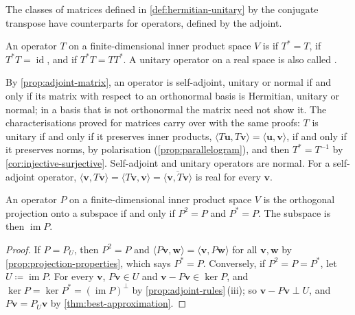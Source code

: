The classes of matrices defined in \cref{def:hermitian-unitary} by the conjugate transpose have counterparts for operators, defined by the adjoint.

\begin{definition}
\label{def:operator-classes}
An operator $T$ on a finite-dimensional inner product space $V$ is  if $T^*=T$,  if $T^*T=\operatorname{id}$, and  if $T^*T=TT^*$. A unitary operator on a real space is also called .
\end{definition}

By \cref{prop:adjoint-matrix}, an operator is self-adjoint, unitary or normal if and only if its matrix with respect to an orthonormal basis is Hermitian, unitary or normal; in a basis that is not orthonormal the matrix need not show it. The characterisations proved for matrices carry over with the same proofs: $T$ is unitary if and only if it preserves inner products, $\langle T\mathbf u,T\mathbf v\rangle=\langle\mathbf u,\mathbf v\rangle$, if and only if it preserves norms, by polarisation (\cref{prop:parallelogram}), and then $T^*=T^{-1}$ by \cref{cor:injective-surjective}. Self-adjoint and unitary operators are normal. For a self-adjoint operator, $\langle\mathbf v,T\mathbf v\rangle=\langle T\mathbf v,\mathbf v\rangle=\overline{\langle\mathbf v,T\mathbf v\rangle}$ is real for every $\mathbf v$.

\begin{proposition}
\label{prop:projection-self-adjoint}
An operator $P$ on a finite-dimensional inner product space $V$ is the orthogonal projection onto a subspace if and only if $P^2=P$ and $P^*=P$. The subspace is then $\operatorname{im}P$.
\end{proposition}

\begin{proof}
If $P=P_U$, then $P^2=P$ and $\langle P\mathbf v,\mathbf w\rangle=\langle\mathbf v,P\mathbf w\rangle$ for all $\mathbf v,\mathbf w$ by \cref{prop:projection-properties}, which says $P^*=P$. Conversely, if $P^2=P=P^*$, let $U\coloneqq\operatorname{im}P$. For every $\mathbf v$, $P\mathbf v\in U$ and $\mathbf v-P\mathbf v\in\ker P$, and $\ker P=\ker P^*=(\operatorname{im}P)^\perp$ by \cref{prop:adjoint-rules}\,(iii); so $\mathbf v-P\mathbf v\perp U$, and $P\mathbf v=P_U\mathbf v$ by \cref{thm:best-approximation}.
\end{proof}

